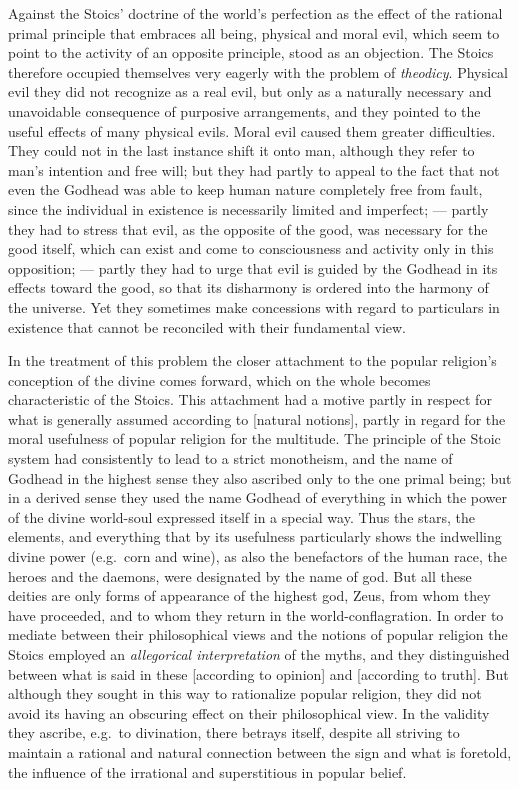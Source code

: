 Against the Stoics' doctrine of the world's perfection as the effect of
the rational primal principle that embraces all being, physical and moral
evil, which seem to point to the activity of an opposite principle, stood
as an objection. The Stoics therefore occupied themselves very eagerly
with the problem of \emph{theodicy}. Physical evil they did not recognize
as a real evil, but only as a naturally necessary and unavoidable
consequence of purposive arrangements, and they pointed to the useful
effects of many physical evils. Moral evil caused them greater
difficulties. They could not in the last instance shift it onto man,
although they refer to man's intention and free will; but they had partly
to appeal to the fact that not even the Godhead was able to keep human
nature completely free from fault, since the individual in existence is
necessarily limited and imperfect; --- partly they had to stress that
evil, as the opposite of the good, was necessary for the good itself,
which can exist and come to consciousness and activity only in this
opposition; --- partly they had to urge that evil is guided by the
Godhead in its effects toward the good, so that its disharmony
is ordered into the harmony of the universe. Yet they sometimes make
concessions with regard to particulars in existence that cannot be
reconciled with their fundamental view.

In the treatment of this problem the closer attachment to the popular
religion's conception of the divine comes forward, which on the whole
becomes characteristic of the Stoics. This attachment had a motive partly
in respect for what is generally assumed according to
 [natural notions], partly in regard for the moral
usefulness of popular religion for the multitude. The principle of the
Stoic system had consistently to lead to a strict monotheism, and the
name of Godhead in the highest sense they also ascribed only to the one
primal being; but in a derived sense they used the name Godhead of
everything in which the power of the divine world-soul expressed itself
in a special way. Thus the stars, the elements, and everything that by
its usefulness particularly shows the indwelling divine power (e.g.\
corn and wine), as also the benefactors of the human race, the heroes and
the daemons, were designated by the name of god. But all these deities
are only forms of appearance of the highest god, Zeus, from whom they
have proceeded, and to whom they return in the world-conflagration. In
order to mediate between their philosophical views and the notions of
popular religion the Stoics employed an \emph{allegorical interpretation}
of the myths, and they distinguished between what is said in these
\gk{κατὰ δόξαν} [according to opinion] and \gk{κατ' ἀλήθειαν} [according
to truth]. But although they sought in this way to rationalize popular
religion, they did not avoid its having an obscuring effect on their
philosophical view. In the validity they ascribe, e.g.\ to divination,
there betrays itself, despite all striving to maintain a rational and
natural connection between the sign and what is foretold, the influence
of the irrational and superstitious in popular belief.

